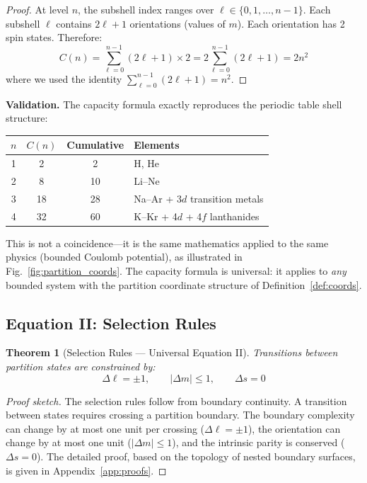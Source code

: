 \documentclass[aps,prx,superscriptaddress,twocolumn,10pt,a4paper,longbibliography,preprint]{revtex4-2}
\newtheorem{theorem}{Theorem}[section]
\theoremstyle{definition}
\theoremstyle{remark}
\begin{document}
\begin{proof}
At level $n$, the subshell index ranges over $\ell \in \{0, 1, \ldots, n-1\}$. Each subshell $\ell$ contains $2\ell + 1$ orientations (values of $m$). Each orientation has 2 spin states. Therefore:
\begin{equation}
C(n) = \sum_{\ell=0}^{n-1} (2\ell + 1) \times 2 = 2 \sum_{\ell=0}^{n-1} (2\ell + 1) = 2n^2
\end{equation}
where we used the identity $\sum_{\ell=0}^{n-1}(2\ell+1) = n^2$.
\end{proof}

\textbf{Validation.} The capacity formula exactly reproduces the periodic table shell structure:
\begin{center}
\begin{tabular}{cccl}
\toprule
$n$ & $C(n)$ & Cumulative & Elements \\
\midrule
1 & 2 & 2 & H, He \\
2 & 8 & 10 & Li--Ne \\
3 & 18 & 28 & Na--Ar + 3$d$ transition metals \\
4 & 32 & 60 & K--Kr + 4$d$ + 4$f$ lanthanides \\
\bottomrule
\end{tabular}
\end{center}

This is not a coincidence---it is the same mathematics applied to the same physics (bounded Coulomb potential), as illustrated in Fig.~\ref{fig:partition_coords}. The capacity formula is universal: it applies to \emph{any} bounded system with the partition coordinate structure of Definition~\ref{def:coords}.

\subsection{Equation II: Selection Rules}

\begin{theorem}[Selection Rules --- Universal Equation II]
\label{thm:selection}
Transitions between partition states are constrained by:
\begin{equation}
\boxed{\Delta\ell = \pm 1, \qquad |\Delta m| \leq 1, \qquad \Delta s = 0}
\label{eq:selection}
\end{equation}
\end{theorem}

\begin{proof}[Proof sketch]
The selection rules follow from boundary continuity. A transition between states requires crossing a partition boundary. The boundary complexity can change by at most one unit per crossing ($\Delta\ell = \pm 1$), the orientation can change by at most one unit ($|\Delta m| \leq 1$), and the intrinsic parity is conserved ($\Delta s = 0$). The detailed proof, based on the topology of nested boundary surfaces, is given in Appendix~\ref{app:proofs}.
\end{proof}
\end{document}
